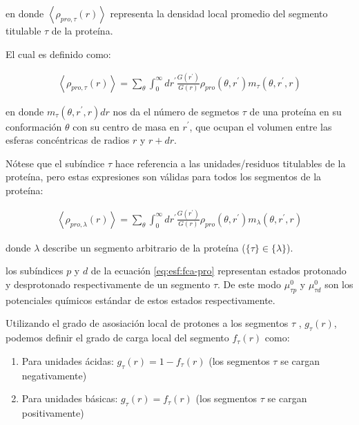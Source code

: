 \noindent en donde $\left<\rho_{pro,\tau}(r)\right>$ representa la densidad local promedio del segmento titulable $\tau$ de la prote\'ina.

El cual es definido como:


\begin{align}
	\left<\rho_{pro,\tau}(r)\right> = \sum_\theta \int_0^\infty dr^\prime \frac{G(r^\prime)}{G(r)} \rho_{pro}(\theta,r^\prime)m_\tau(\theta,r^\prime,r)
	\label{eq:esf:segments-pro-vector}
\end{align}


\noindent en donde $m_\tau(\theta,r^\prime,r) dr$  nos da el n\'umero de segmetos $\tau$  de una prote\'ina en su conformaci\'on $\theta$ con su centro de masa en $r^\prime$, que ocupan el volumen entre las esferas conc\'entricas de radios $r$ y $r + dr$.



N\'otese que el sub\'indice  $\tau$ hace referencia a las unidades/residuos titulables de la prote\'ina, pero estas expresiones son v\'alidas para todos los segmentos de la prote\'ina:

\begin{align}
	\left<\rho_{pro,\lambda}(r)\right> = \sum_\theta \int_0^\infty dr^\prime \frac{G(r^\prime)}{G(r)} \rho_{pro}(\theta,r^\prime)m_\lambda(\theta,r^\prime,r)
	\label{eq:esf:segments-pro}
\end{align}



\noindent donde $\lambda$  describe un segmento arbitrario de la prote\'ina ($\{\tau\}\in\{\lambda\}$).

los sub\'indices $p$ y $d$  de la ecuaci\'on \ref{eq:esf:fca-pro} representan estados protonado y desprotonado respectivamente de un segmento $\tau$. 
De este modo $\mu^0_{\tau p}$ y $\mu^0_{\tau d}$  son los potenciales qu\'imicos est\'andar de estos estados respectivamente.

Utilizando el grado de asosiaci\'on local de protones a los segmentos $\tau$ , $g_\tau (r)$, podemos definir el grado de carga local del segmento $f_\tau (r)$ como:
 
\begin{enumerate}
	\item Para unidades \'acidas: $g_\tau(r) = 1-f_\tau(r)$ (los segmentos $\tau$ se cargan negativamente)
	\item Para unidades b\'asicas: $g_\tau(r) = f_\tau(r)$ (los segmentos $\tau$ se cargan positivamente)
\end{enumerate}

